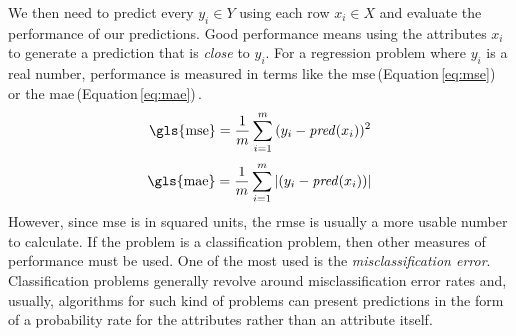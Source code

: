 \documentclass[USenglish]{uit-thesis}
\begin{document}
We then need to predict every $y_i \in Y$ using each row
$x_i \in X$ and evaluate the performance of our predictions.
Good performance means using the attributes $x_i$ to generate
a prediction that is \emph{close} to $y_i$. For a regression
problem where $y_i$ is a real number, performance is
measured in terms like the \gls{mse}\,(Equation\,\ref{eq:mse})
or the \gls{mae}\,(Equation\,\ref{eq:mae})\,\cite{bowles2015machine}.
\begin{equation}
\label{eq:mse}
\text{\gls{mse}} = \frac{1}{m}\sum_{i=1}^{m}{(y_i - \text{\emph{pred}}(x_i))^2}
\end{equation}
\begin{equation}
\label{eq:mae}
\text{\gls{mae}} = \frac{1}{m}\sum_{i=1}^{m}{|(y_i - \text{\emph{pred}}(x_i))|}
\end{equation}
However, since \gls{mse} is in squared units,
the \gls{rmse} is usually a more usable number to calculate.
If the problem is a classification problem,
then other measures of performance must be used.
One of the most used is the \emph{misclassification error}.
Classification problems generally revolve around
misclassification error rates and, usually,
algorithms for such kind of problems can
present predictions in the form of a probability
rate for the attributes rather than an attribute itself.
\end{document}
